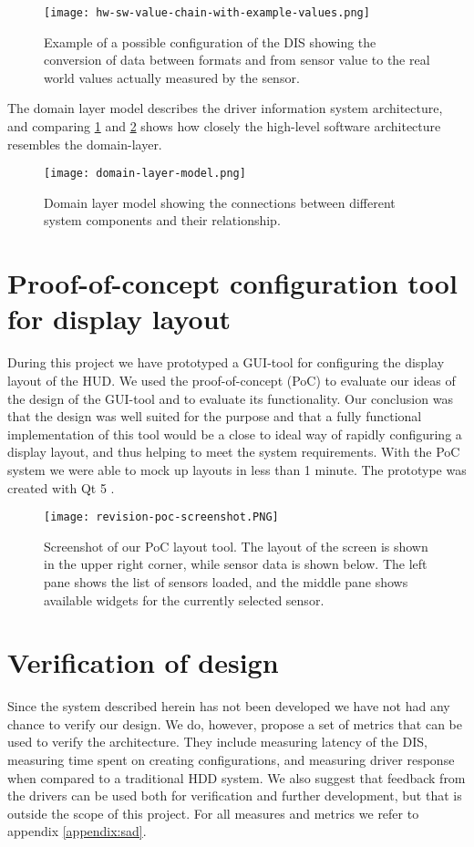 \begin{figure}[!htbp]
	\texttt{[image: hw-sw-value-chain-with-example-values.png]}
	\caption{Example of a possible configuration of the DIS showing the conversion
	of data between formats and from sensor value to the real world values
	actually measured by the sensor. 
	}
	\label{fig:hw-sw-value-chain-examples}
\end{figure}

The domain layer model describes the driver information system architecture,
and comparing \ref{fig:hw-sw-value-chain-examples} and \ref{fig:domain-layer-model}
shows how closely the high-level software architecture resembles the
domain-layer. 

\begin{figure}[!htbp]
	\texttt{[image: domain-layer-model.png]}
	\caption{Domain layer model showing the connections between different system
	components and their relationship.
	}
	\label{fig:domain-layer-model}
\end{figure}

\section{Proof-of-concept configuration tool for display layout}
\label{results:poc}
During this project we have prototyped a GUI-tool for configuring the display
layout of the HUD. We used the proof-of-concept (PoC) to evaluate our ideas of
the design of the GUI-tool and to evaluate its functionality. Our conclusion
was that the design was well suited for the purpose and that a fully functional
implementation of this tool would be a close to ideal way of rapidly
configuring a display layout, and thus helping to meet the system requirements.
With the PoC system we were able to mock up layouts in less than 1 minute. The
prototype was created with Qt 5 \cite{qt:digiaAboutUs}.

\begin{figure}[!htbp]
	\texttt{[image: revision-poc-screenshot.PNG]}
	\caption{Screenshot of our PoC layout tool. The layout of the screen is
	shown in the upper right corner, while sensor data is shown below. The left
	pane shows the list of sensors loaded, and the middle pane shows available
	widgets for the currently selected sensor.
	}
	\label{fig:poc-screenshot}
\end{figure}

\section{Verification of design}
Since the system described herein has not been developed we have not had any
chance to verify our design. We do, however, propose a set of metrics that can
be used to verify the architecture. They include measuring latency of the DIS, 
measuring time spent on creating configurations,
and measuring driver response when compared to a traditional HDD system. We
also suggest that feedback from the drivers can be used both for verification and
further development, but that is outside the scope of this project. For all
measures and metrics we refer to appendix \vref{appendix:sad}. 
